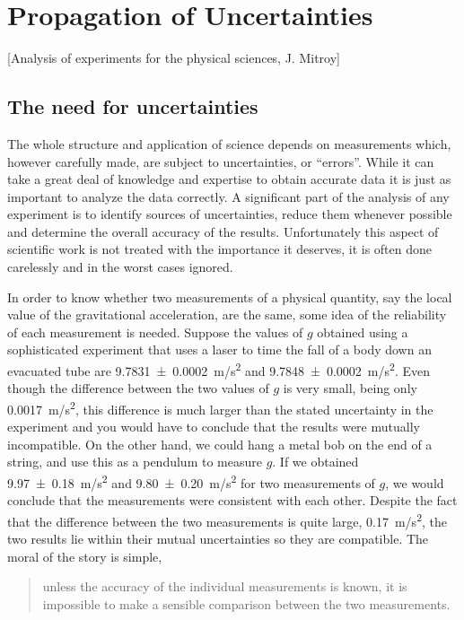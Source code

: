 \section{Propagation of Uncertainties}

[Analysis of experiments for the physical sciences, J. Mitroy]

\subsection{The need for uncertainties}
The whole structure and application of science depends on measurements which, however carefully made, are subject to uncertainties, or ``errors''. While it can take a great deal of knowledge and expertise to obtain accurate data it is just as important to analyze the data correctly. A significant part of the analysis of any experiment is to identify sources of uncertainties, reduce them whenever possible and determine the overall accuracy of the results. Unfortunately this aspect of scientific work is not treated with the importance it deserves, it is often done carelessly and in the worst cases ignored.

In order to know whether two measurements of a physical quantity, say the local value of the gravitational acceleration, are the same, some idea of the reliability of each measurement is needed. Suppose the values of $g$ obtained using a sophisticated experiment that uses a laser to time the fall of a body down an evacuated tube are \SI{9.7831+-0.0002}{m/s^2} and \SI{9.7848+-0.0002}{m/s^2}. Even though the difference between the two values of $g$ is very small, being only \SI{0.0017}{m/s^2}, this difference is much larger than the stated uncertainty in the experiment and you would have to conclude that the results were mutually incompatible. On the other hand, we could hang a metal bob on the end of a string, and use this as a pendulum to measure $g$. If we obtained \SI{9.97+-0.18}{ m/s^2} and \SI{9.80+-0.20}{m/s^2} for two measurements of $g$, we would conclude that the measurements were consistent with each other. Despite the fact that the difference between the two measurements is quite large, \SI{0.17}{m/s^2}, the two results lie within their mutual uncertainties so they are compatible. The moral of the story is simple, 
\begin{quote}
unless the accuracy of the individual measurements is known, it is impossible to make a sensible comparison between the two measurements.
\end{quote}

